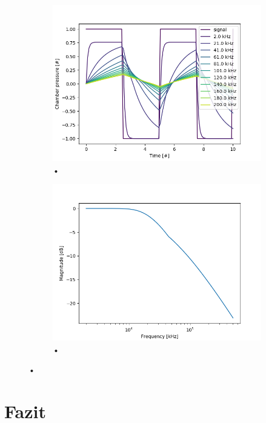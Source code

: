 \documentclass[fontsize=12pt, a4paper]{scrartcl}
\let\stdsection\section 	%
\renewcommand\section{\newpage\stdsection}
\begin{document}
\begin{figure}[H]
    \centering
    \begin{subfigure}[H]{0.48\textwidth}
        \includegraphics[width=\textwidth, valign=t]{bilder/frequency/frequency_sweep.png}
        \caption{•}
    \end{subfigure}
    \begin{subfigure}[H]{0.48\textwidth}
        \includegraphics[width=\textwidth, valign=t]{bilder/frequency/bode_diagram.png}
        \caption{•}
    \end{subfigure}
    \caption{•}
\end{figure}

\section{Fazit}
\end{document}
